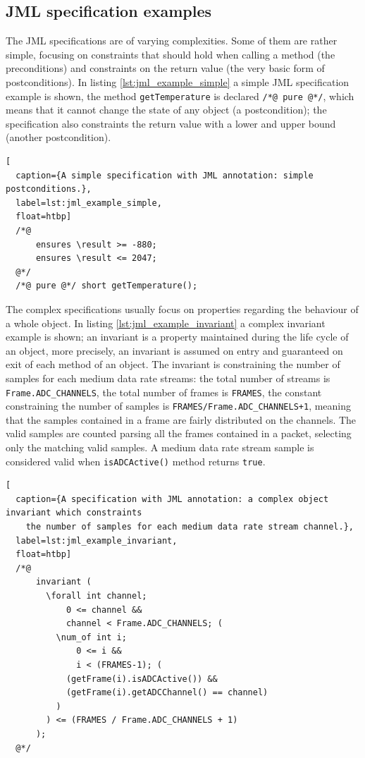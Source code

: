 \documentclass{article}
\newcommand{\lil}[1]{\texttt{\lstinline|#1|}}
\begin{document}
\subsection{JML specification examples}
\label{subsec:a_jml_specification_example}

The JML specifications are of varying complexities.  
Some of them are rather simple, focusing on constraints that should hold when calling a method (the preconditions) and constraints on the return value (the very basic form of postconditions). 
In listing \ref{lst:jml_example_simple} a simple JML specification example is shown, the method \lil{getTemperature} is declared \lil{/*@ pure @*/}, which means that it cannot change the state of any object (a postcondition); the specification also constraints the return value with a lower and upper bound (another postcondition).

\begin{lstlisting}[
  caption={A simple specification with JML annotation: simple postconditions.},
  label=lst:jml_example_simple,
  float=htbp]
  /*@ 
      ensures \result >= -880; 
      ensures \result <= 2047; 
  @*/ 
  /*@ pure @*/ short getTemperature();
\end{lstlisting}

\sloppy

The complex specifications usually focus on properties regarding the behaviour of a whole object.
In listing \ref{lst:jml_example_invariant} a complex invariant example is shown; an invariant is a property maintained during the life cycle of an object, more precisely, an invariant is assumed on entry and guaranteed on exit of each method of an object. 
The invariant is constraining the number of samples for each medium data rate streams: the total number of streams is \lil{Frame.ADC_CHANNELS}, the total number of frames is \lil{FRAMES}, the constant constraining the number of samples is \lil{FRAMES/Frame.ADC_CHANNELS+1}, meaning that the samples contained in a frame are fairly distributed on the channels.
The valid samples are counted parsing all the frames contained in a packet, selecting only the matching valid samples.  
A medium data rate stream sample is considered valid when \lil{isADCActive()} method returns \lil{true}.

\fussy

\begin{lstlisting}[
  caption={A specification with JML annotation: a complex object invariant which constraints 
    the number of samples for each medium data rate stream channel.},
  label=lst:jml_example_invariant,
  float=htbp]
  /*@ 
      invariant ( 
        \forall int channel; 
            0 <= channel && 
            channel < Frame.ADC_CHANNELS; ( 
          \num_of int i; 
              0 <= i && 
              i < (FRAMES-1); (
            (getFrame(i).isADCActive()) && 
            (getFrame(i).getADCChannel() == channel)
          ) 
        ) <= (FRAMES / Frame.ADC_CHANNELS + 1) 
      ); 
  @*/
\end{lstlisting}
\end{document}
